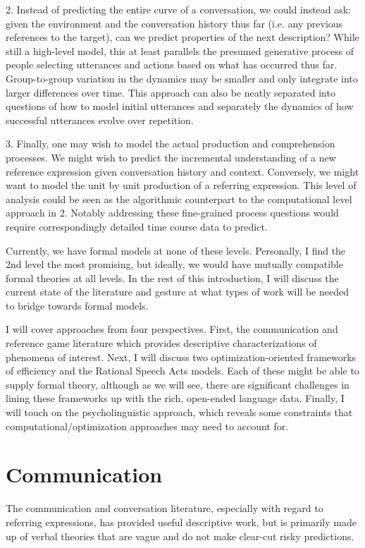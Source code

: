 \documentclass[]{article}
\begin{document}
	2. Instead of predicting the entire curve of a conversation, we could instead ask: given the environment and the conversation history thus far (i.e. any previous references to the target), can we predict properties of the next description? While still a high-level model, this at least parallels the presumed generative process of people selecting utterances and actions based on what has occurred thus far. Group-to-group variation in the dynamics may be smaller and only integrate into larger differences over time. This approach can also be neatly separated into questions of how to model initial utterances and separately the dynamics of how successful utterances evolve over repetition. 
	
	3. Finally, one may wish to model the actual production and comprehension processes. We might wish to predict the incremental understanding of a new reference expression given conversation history and context. Conversely, we might want to model the unit by unit production of a referring expression. This level of analysis could be seen as the algorithmic counterpart to the computational level approach in 2. Notably addressing these fine-grained process questions would require correspondingly detailed time course data to predict. 
	
	Currently, we have formal models at none of these levels. Personally, I find the 2nd level the most promising, but ideally, we would have mutually compatible formal theories at all levels. In the rest of this introduction, I will discuss the current state of the literature and gesture at what types of work will be needed to bridge towards formal models. 
	
	I will cover approaches from four perspectives. First, the communication and reference game literature which provides descriptive characterizations of phenomena of interest. Next, I will discuss two optimization-oriented frameworks of efficiency and the Rational Speech Acts models. Each of these might be able to supply formal theory, although as we will see, there are significant challenges in lining these frameworks up with the rich, open-ended language data. Finally, I will touch on the psycholinguistic approach, which reveals some constraints that computational/optimization approaches may need to account for. 
	

\section{Communication}
The communication and conversation literature, especially with regard to referring expressions, has provided useful descriptive work, but is primarily made up of verbal theories that are vague and do not make clear-cut risky predictions. 
\end{document}
